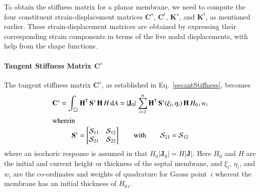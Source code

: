 To obtain the stiffness matrix for a planar membrane, we need to compute the four constituent strain-displacement matrices $\mathbf{C}^s$, $\mathbf{C}^t$, $\mathbf{K}^s$, and $\mathbf{K}^t$, as mentioned earlier. These strain-displacement matrices are obtained by expressing their corresponding strain components in terms of the five nodal displacements, with help from the shape functions.


\paragraph{Tangent Stiffness Matrix $\mathbf{C}^s$}

The tangent stiffness matrix $\mathbf{C}^s$, as established in Eq.~\ref{secantStiffness}, becomes 
\begin{subequations}
	\begin{gather}
		\mathbf{C}^s = \int_{\pentagon} \mathbf{H}^{\mathsf{T}} \,  \mathbf{S}^s \, \mathbf{H} \, H \, \mathrm{d} A
		=  | \mathbf{J}_0 |  \, \sum_{i=1}^{n} \mathbf{H}^{\mathsf{T}} \, \mathbf{S}^s (\xi_i , \eta_i) \, \mathbf{H} \, H_{0\,i} \, w_i \\
        \intertext{wherein}
        \mathbf{S}^s = \begin{bmatrix}
        	\mathcal{S}_{11} & \mathcal{S}_{12} \\
        	\mathcal{S}_{21} & \mathcal{S}_{22}
        \end{bmatrix} 
        \qquad \text{with} \qquad
        \mathcal{S}_{21} = \mathcal{S}_{12}
    \label{stressMtx2D}
	\end{gather}
\end{subequations}
where an isochoric response is assumed in that $H_0 | \mathbf{J}_0 | = H | \mathbf{J} |$. Here $H_0$ and $H$ are the initial and current height or thickness of the septal membrane, and $\xi_i$, $\eta_i$, and $w_i$ are the co-ordinates and weights of quadrature for Gauss point~$i$ whereat the membrane has an initial thickness of $H_{0\,i}$. 

